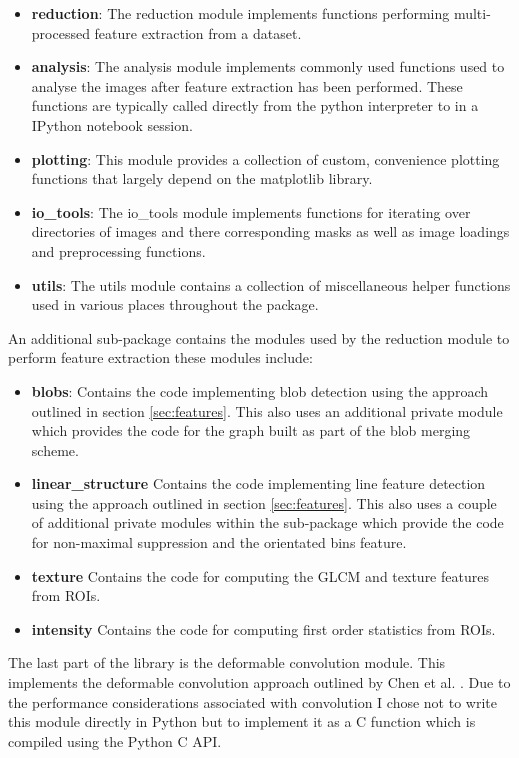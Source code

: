 \begin{itemize}
	\item {\bf reduction}: The reduction module implements functions performing multi-processed feature extraction from a dataset.
	\item {\bf analysis}: The analysis module implements commonly used functions used to analyse the images after feature extraction has been performed. These functions are typically called directly from the python interpreter to in a IPython notebook session.
	\item {\bf plotting}: This module provides a collection of custom, convenience plotting functions that largely depend on the matplotlib library.
	\item {\bf io\_tools}: The io\_tools module implements functions for iterating over directories of images and there corresponding masks as well as image loadings and preprocessing functions.
	\item {\bf utils}: The utils module contains a collection of miscellaneous helper functions used in various places throughout the package.
\end{itemize}

An additional sub-package contains the modules used by the reduction module to perform feature extraction these modules include:

\begin{itemize}
	\item {\bf blobs}: Contains the code implementing blob detection using the approach outlined in section \ref{sec:features}. This also uses an additional private module which provides the code for the graph built as part of the blob merging scheme.
	\item {\bf linear\_structure} Contains the code implementing line feature detection using the approach outlined in section \ref{sec:features}. This also uses a couple of additional private modules within the sub-package which provide the code for non-maximal suppression and the orientated bins feature. 
	\item {\bf texture} Contains the code for computing the GLCM and texture features from ROIs.
	\item {\bf intensity} Contains the code for computing first order statistics from ROIs.
\end{itemize}

The last part of the library is the deformable convolution module. This implements the deformable convolution approach outlined by Chen et al. \cite{chen2013multiscale}. Due to the performance considerations associated with convolution I chose not to write this module directly in Python but to implement it as a C function which is compiled using the Python C API.

